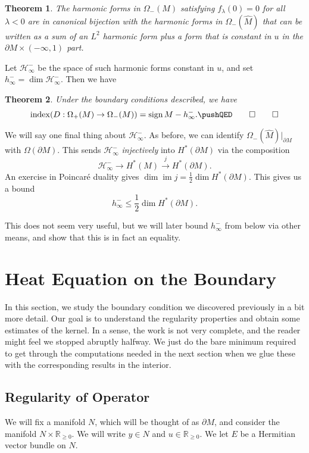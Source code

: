 \documentclass{shortart}
\newtheorem{thm}{Theorem}[section]
\theoremstyle{definition}
\newcommand\R{\mathbb{R}}
\DeclareMathOperator\im{im}
\DeclareMathOperator\idx{index}
\DeclareMathOperator\sign{sign}
\begin{document}
\begin{thm}
  The harmonic forms in $\Omega_-(M)$ satisfying $f_\lambda(0) = 0$ for all $\lambda < 0$ are in canonical bijection with the harmonic forms in $\Omega_-(\hat{M})$ that can be written as a sum of an $L^2$ harmonic form plus a form that is constant in $u$ in the $\partial M \times (-\infty, 1)$ part.\fakeqed
\end{thm}

Let $\mathcal{H}_\infty^-$ be the space of such harmonic forms constant in $u$, and set $h_\infty^- = \dim \mathcal{H}_\infty^-$. Then we have

\begin{thm}\label{theorem:index-sign-boundary}
  Under the boundary conditions described, we have
  \[
    \idx (D: \Omega_+(M) \to \Omega_-(M)) = \sign M - h^-_\infty.\fakeqed
  \]\ifplastex\fakeqed\fi
\end{thm}

We will say one final thing about $\mathcal{H}^-_\infty$. As before, we can identify $\Omega_-(\hat{M})|_{\partial M}$ with $\Omega(\partial M)$. This sends $\mathcal{H}_\infty^-$ \emph{injectively} into $H^*(\partial M)$ via the composition
\[
  \mathcal{H}^-_\infty \to H^*(M) \overset{j}{\to} H^*(\partial M).
\]
An exercise in Poincar\'e duality gives $\dim \im j = \frac{1}{2} \dim H^*(\partial M)$. This gives us a bound
\[
  h^-_\infty \leq \frac{1}{2}\dim H^*(\partial M).
\]

This does not seem very useful, but we will later bound $h^-_\infty$ from below via other means, and show that this is in fact an equality.

\section{Heat Equation on the Boundary}\label{section:on-boundary}
In this section, we study the boundary condition we discovered previously in a bit more detail. Our goal is to understand the regularity properties and obtain some estimates of the kernel. In a sense, the work is not very complete, and the reader might feel we stopped abruptly halfway. We just do the bare minimum required to get through the computations needed in the next section when we glue these with the corresponding results in the interior.

\subsection{Regularity of Operator}
We will fix a manifold $N$, which will be thought of as $\partial M$, and consider the manifold $N \times \R_{\geq 0}$. We will write $y \in N$ and $u \in \R_{\geq 0}$. We let $E$ be a Hermitian vector bundle on $N$.
\end{document}
